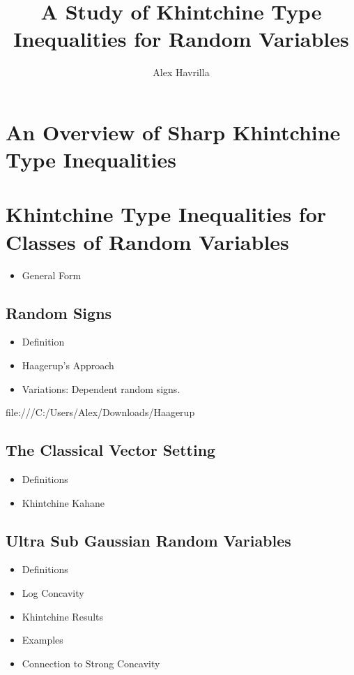 \documentclass[10pt]{article}
\title{\vspace{-3em}A Study of Khintchine Type Inequalities for Random Variables}
\author{Alex Havrilla}
\newcommand{\1}{\textbf{1}}
\theoremstyle{remark}
\theoremstyle{definition}
\begin{document}
\maketitle

\section{An Overview of Sharp Khintchine Type Inequalities}

\section{Khintchine Type Inequalities for Classes of Random Variables}

\begin{itemize}
	\item General Form
\end{itemize}

\subsection{Random Signs}

\begin{itemize}
	\item Definition
	\item Haagerup's Approach
	\item Variations: Dependent random signs.
\end{itemize}

file:///C:/Users/Alex/Downloads/Haagerup%

\subsection{The Classical Vector Setting}

\begin{itemize}
	\item Definitions
	\item Khintchine Kahane
\end{itemize}

\subsection{Ultra Sub Gaussian Random Variables}

\begin{itemize}
	\item Definitions
	\item Log Concavity
	\item Khintchine Results
	\item Examples
	\item Connection to Strong Concavity
\end{itemize}
\end{document}
